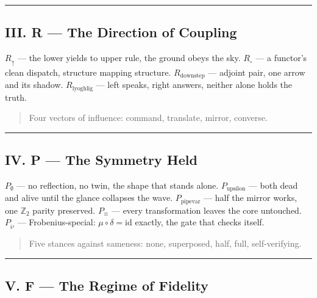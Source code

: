 \documentclass[12pt,a4paper]{article}
\begin{document}
\begin{center}
\rule{0.5\textwidth}{0.4pt}
\end{center}

\subsection{III. R --- The Direction of Coupling}

\emph{$R_{\uparrow}$} --- the lower yields to upper rule, the ground obeys the sky.
\emph{$R_{\circ}$} --- a functor's clean dispatch, structure mapping structure.
\emph{$R_{\text{downstep}}$} --- adjoint pair, one arrow and its shadow.
\emph{$R_{\text{lyoghlig}}$} --- left speaks, right answers, neither alone holds the truth.

\begin{quote}
Four vectors of influence: command, translate, mirror, converse.

\end{quote}

\begin{center}
\rule{0.5\textwidth}{0.4pt}
\end{center}

\subsection{IV. P --- The Symmetry Held}

\emph{$P_{\emptyset}$} --- no reflection, no twin, the shape that stands alone.
\emph{$P_{\text{upsilon}}$} --- both dead and alive until the glance collapses the wave.
\emph{$P_{\text{pipevar}}$} --- half the mirror works, one $\mathbb{Z}_2$ parity preserved.
\emph{$P_{\equiv}$} --- every transformation leaves the core untouched.
\emph{$P_{\wp}$} --- Frobenius-special: $\mu \circ \delta = \text{id}$ exactly, the gate that checks itself.

\begin{quote}
Five stances against sameness: none, superposed, half, full, self-verifying.

\end{quote}

\begin{center}
\rule{0.5\textwidth}{0.4pt}
\end{center}

\subsection{V. F --- The Regime of Fidelity}
\end{document}
